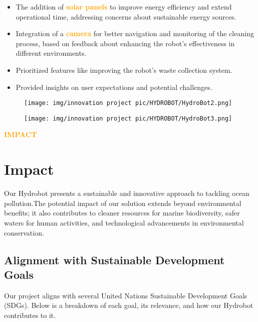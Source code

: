 \begin{itemize}
    \item The addition of \textbf{\textcolor{orange}{solar panels}} to improve energy efficiency and extend operational time, addressing concerns about sustainable energy sources.
    \item Integration of a \textbf{\textcolor{orange}{camera}} for better navigation and monitoring of the cleaning process, based on feedback about enhancing the robot's effectiveness in different environments.
    \item Prioritized features like improving the robot's waste collection system.
    \item Provided insights on user expectations and potential challenges.
  
\end{itemize}
\begin{figure}[h!]
    \centering
    \begin{minipage}{0.45\textwidth}
        \centering
        \texttt{[image: img/innovation project pic/HYDROBOT/HydroBot2.png]}
       
    \end{minipage}
    \hfill
    \begin{minipage}{0.45\textwidth}
        \centering
        \texttt{[image: img/innovation project pic/HYDROBOT/HydroBot3.png]}
       
    \end{minipage}
\end{figure}




\newpage
\begin{center}
    \huge \textbf{\textcolor{orange}{IMPACT}} \\[0.5cm]
 
\end{center}
\section{\large \textbf{Impact}}
Our Hydrobot presents a sustainable and innovative approach to tackling ocean pollution.The potential impact of our solution extends beyond environmental benefits; it also contributes to cleaner resources for marine biodiversity, safer waters for human activities, and technological advancements in environmental conservation.

\subsection{Alignment with Sustainable Development Goals}
Our project aligns with several United Nations Sustainable Development Goals (SDGs). Below is a breakdown of each goal, its relevance, and how our Hydrobot contributes to it.


